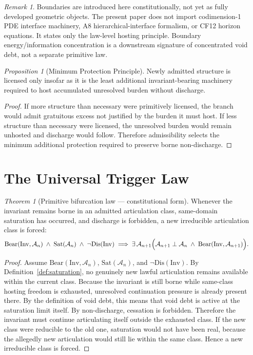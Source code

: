 \documentclass[11pt]{article}
\theoremstyle{definition}
\theoremstyle{plain}
\theoremstyle{remark}
\newtheorem{theorem}{Theorem}
\newtheorem{proposition}{Proposition}
\newtheorem{remark}{Remark}
\newcommand{\Inv}{\mathrm{Inv}}
\newcommand{\Sat}{\mathrm{Sat}}
\newcommand{\Bear}{\mathrm{Bear}}
\newcommand{\Dis}{\mathrm{Dis}}
\newcommand{\Aclass}{\mathcal{A}}
\begin{document}
\begin{remark}
Boundaries are introduced here constitutionally, not yet as fully developed geometric objects. The present paper does not import codimension-1 PDE interface machinery, A8 hierarchical-interface formalism, or CF12 horizon equations. It states only the law-level hosting principle. Boundary energy/information concentration is a downstream signature of concentrated void debt, not a separate primitive law.
\end{remark}

\begin{proposition}[Minimum Protection Principle]
Newly admitted structure is licensed only insofar as it is the least additional invariant-bearing machinery required to host accumulated unresolved burden without discharge.
\end{proposition}

\begin{proof}
If more structure than necessary were primitively licensed, the branch would admit gratuitous excess not justified by the burden it must host. If less structure than necessary were licensed, the unresolved burden would remain unhosted and discharge would follow. Therefore admissibility selects the minimum additional protection required to preserve borne non-discharge. 
\end{proof}

\section{The Universal Trigger Law}

\begin{theorem}[Primitive bifurcation law --- constitutional form]
\label{thm:primitive-bifurcation}
Whenever the invariant remains borne in an admitted articulation class, same-domain saturation has occurred, and discharge is forbidden, a new irreducible articulation class is forced:
\begin{equation}
\label{eq:trigger-law}
\Bear(\Inv,\Aclass_n)
\;\wedge\;
\Sat(\Aclass_n)
\;\wedge\;
\neg\Dis(\Inv)
\;\Longrightarrow\;
\exists \, \Aclass_{n+1}
\Bigl(
\Aclass_{n+1}\perp \Aclass_n
\;\wedge\;
\Bear(\Inv,\Aclass_{n+1})
\Bigr).
\end{equation}
\end{theorem}

\begin{proof}
Assume $\Bear(\Inv,\Aclass_n)$, $\Sat(\Aclass_n)$, and $\neg\Dis(\Inv)$. By Definition~\ref{def:saturation}, no genuinely new lawful articulation remains available within the current class. Because the invariant is still borne while same-class hosting freedom is exhausted, unresolved continuation pressure is already present there. By the definition of void debt, this means that void debt is active at the saturation limit itself. By non-discharge, cessation is forbidden. Therefore the invariant must continue articulating itself outside the exhausted class. If the new class were reducible to the old one, saturation would not have been real, because the allegedly new articulation would still lie within the same class. Hence a new irreducible class is forced.
\end{proof}
\end{document}
